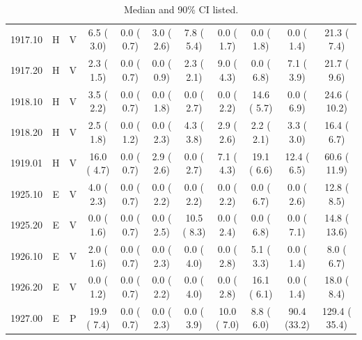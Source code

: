\documentclass[11pt,twocolumn]{article}
\begin{document}
\begin{table}[]
{\begin{tabular}{ccccccccccc}
1917.10 & H & V &  6.5 ( 3.0) &  0.0 ( 0.7) &  3.0 ( 2.6) &  7.8 ( 5.4) &  0.0 ( 1.7) &  0.0 ( 1.8) &  0.0 ( 1.4) &  21.3 (  7.4) \\
1917.20 & H & V &  2.3 ( 1.5) &  0.0 ( 0.7) &  0.0 ( 0.9) &  2.3 ( 2.1) &  9.0 ( 4.3) &  0.0 ( 6.8) &  7.1 ( 3.9) &  21.7 (  9.6) \\
1918.10 & H & V &  3.5 ( 2.2) &  0.0 ( 0.7) &  0.0 ( 1.8) &  0.0 ( 2.7) &  0.0 ( 2.2) & 14.6 ( 5.7) &  0.0 ( 6.9) &  24.6 ( 10.2) \\
1918.20 & H & V &  2.5 ( 1.8) &  0.0 ( 1.2) &  0.0 ( 2.3) &  4.3 ( 3.8) &  2.9 ( 2.6) &  2.2 ( 2.1) &  3.3 ( 3.0) &  16.4 (  6.7) \\
1919.01 & H & V & 16.0 ( 4.7) &  0.0 ( 0.7) &  2.9 ( 2.6) &  0.0 ( 2.7) &  7.1 ( 4.3) & 19.1 ( 6.6) & 12.4 ( 6.5) &  60.6 ( 11.9) \\
1925.10 & E & V &  4.0 ( 2.3) &  0.0 ( 0.7) &  0.0 ( 2.2) &  0.0 ( 2.2) &  0.0 ( 2.2) &  0.0 ( 6.7) &  0.0 ( 2.6) &  12.8 (  8.5) \\
1925.20 & E & V &  0.0 ( 1.6) &  0.0 ( 0.7) &  0.0 ( 2.5) & 10.5 ( 8.3) &  0.0 ( 2.4) &  0.0 ( 6.8) &  0.0 ( 7.1) &  14.8 ( 13.6) \\
1926.10 & E & V &  2.0 ( 1.6) &  0.0 ( 0.7) &  0.0 ( 2.3) &  0.0 ( 4.0) &  0.0 ( 2.8) &  5.1 ( 3.3) &  0.0 ( 1.4) &   8.0 (  6.7) \\
1926.20 & E & V &  0.0 ( 1.2) &  0.0 ( 0.7) &  0.0 ( 2.2) &  0.0 ( 4.0) &  0.0 ( 2.8) & 16.1 ( 6.1) &  0.0 ( 1.4) &  18.0 (  8.4) \\
1927.00 & E & P & 19.9 ( 7.4) &  0.0 ( 0.7) &  0.0 ( 2.3) &  0.0 ( 3.9) & 10.0 ( 7.0) &  8.8 ( 6.0) & 90.4 (33.2) & 129.4 ( 35.4) \\
\bottomrule
\end{tabular}
}
\caption*{Median and 90\% CI listed.}
\label{tbl:allPop}
\end{table}

\end{document}
